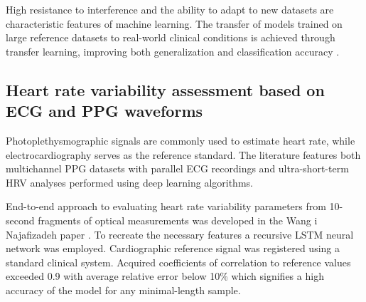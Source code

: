 \documentclass[journal]{IEEEtran}
\begin{document}
High resistance to interference and the ability to adapt to new datasets are characteristic features of machine learning. The transfer of models trained on large reference datasets to real-world clinical conditions is achieved through transfer learning, improving both generalization and classification accuracy \cite{16}.

\subsection{Heart rate variability assessment based on ECG and PPG waveforms}
Photoplethysmographic signals are commonly used to estimate heart rate, while electrocardiography serves as the reference standard. The literature features both multichannel PPG datasets with parallel ECG recordings and ultra-short-term HRV analyses performed using deep learning algorithms.

End-to-end approach to evaluating heart rate variability parameters from 10-second fragments of optical measurements was developed in the Wang i Najafizadeh paper \cite{17}. To recreate the necessary features a recursive LSTM neural network was employed. Cardiographic reference signal was registered using a standard clinical system. Acquired coefficients of correlation to reference values exceeded 0.9 with average relative error below 10\% which signifies a high accuracy of the model for any minimal-length sample.
\end{document}
